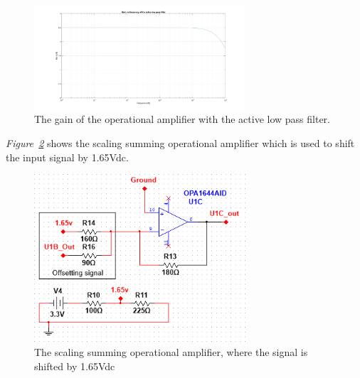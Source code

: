 \begin{figure}[h]
    \centering
    \includegraphics[width=0.7\textwidth]{graphics/Av_Lowpass.png}
    \caption{The gain of the operational amplifier with the active low pass filter.}
    \label{fig:AVlowpass}
\end{figure}

\vspace{4cm}

\textit{Figure~\ref{fig:Opamp3}} shows the scaling summing operational amplifier which is used to shift the input signal by 1.65Vdc. 


\begin{figure}[h]
    \centering
    \includegraphics[width=0.70\textwidth]{graphics/OPamp3.png}
    \caption{The scaling summing operational amplifier, where the signal is shifted by 1.65Vdc}
    \label{fig:Opamp3}
\end{figure}


